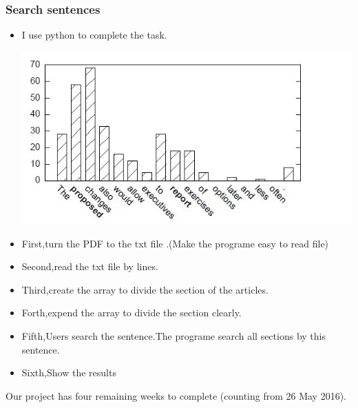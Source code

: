 \subsubsection*{Search sentences}
\begin{itemize}
	\item I use python to complete the task. 
	\begin{center}
		\includegraphics[width=0.8\columnwidth]{Union_Background_Chart_2}
	\end{center}
	\item First,turn the PDF to the txt file .(Make the programe easy to read file)\\ 
	\item Second,read the txt file by lines.\\ 	
	\item Third,create the array to divide the section of the articles.\\ 	
	\item Forth,expend the array to divide the section clearly.\\ 	
	\item Fifth,Users search the sentence.The programe search all sections by this sentence.\\
	\item Sixth,Show the results\\  		
	
\end{itemize}
Our project has four remaining weeks to complete (counting from 26 May 2016). 

\newpage %